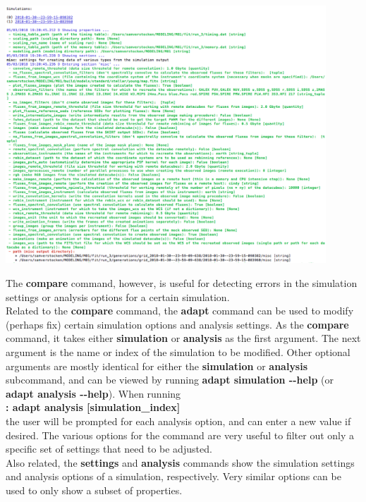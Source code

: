 \documentclass[15pt,a4paper,oneside,openright]{report}
\begin{document}
\begin{center}
\includegraphics[width=0.9\textwidth]{figures/compare_analysis.png}
\end{center}

The \textbf{compare} command, however, is useful for detecting errors in the simulation settings or analysis options for a certain simulation.\\

Related to the \textbf{compare} command, the \textbf{adapt} command can be used to modify (perhaps fix) certain simulation options and analysis settings. As the \textbf{compare} command, it takes either \textbf{simulation} or \textbf{analysis} as the first argument. The next argument is the name or index of the simulation to be modified. Other optional arguments are mostly identical for either the \textbf{simulation} or \textbf{analysis} subcommand, and can be viewed by running \textbf{adapt simulation -{}-help} (or \textbf{adapt analysis -{}-help}). When running\\

\textbf{: adapt analysis [simulation\_index]}\\

the user will be prompted for each analysis option, and can enter a new value if desired. The various options for the command are very useful to filter out only a specific set of settings that need to be adjusted.\\

Also related, the \textbf{settings} and \textbf{analysis} commands show the simulation settings and analysis options of a simulation, respectively. Very similar options can be used to only show a subset of properties.\\
\end{document}
